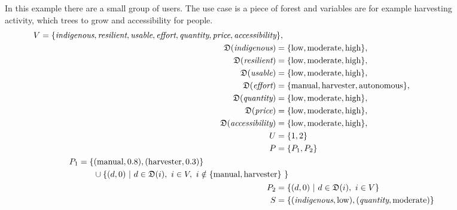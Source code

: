 \begin{figure}
    \begin{mdframed}[frametitle={Example for Forest Use Case}, linecolor=black, frametitlerulecolor=black, frametitlebackgroundcolor=gray!5]
        In this example there are a small group of users. The use case is a piece of forest and variables are for example harvesting activity, which trees to grow and accessibility for people.
        \begin{align}
            \begin{split}
                V = \{ & \textit{indigenous}, \textit{resilient}, \textit{usable}, \textit{effort}, \textit{quantity}, \textit{price}, \textit{accessibility} \},
            \end{split} \notag \\
            \mathfrak{D}(\textit{indigenous}) =  \{ & \text{low}, \text{moderate}, \text{high}\}, \notag \\
            \mathfrak{D}(\textit{resilient}) = \{ & \text{low}, \text{moderate}, \text{high}\}, \notag \\
            \mathfrak{D}(\textit{usable}) = \{ & \text{low}, \text{moderate}, \text{high}\}, \notag \\
            \mathfrak{D}(\textit{effort}) = \{ & \text{manual}, \text{harvester}, \text{autonomous}\}, \notag \\
            \mathfrak{D}(\textit{quantity}) = \{ & \text{low}, \text{moderate}, \text{high}\}, \notag \\
            \mathfrak{D}(\textit{price}) = \{ & \text{low}, \text{moderate}, \text{high}\}, \notag\\
            \mathfrak{D}(\textit{accessibility}) = \{ & \text{low}, \text{moderate}, \text{high}\},\notag \\
            U = \{ & 1,2\} \notag\\
            P = \{ & P_1, P_2\} \notag\\
            \begin{split}
                P_1 = \{ & (\text{manual}, 0.8), (\text{harvester}, 0.3) \} \\ 
                & \cup \{ (d,0)\ |\ d \in \mathfrak{D}(i),\ i \in V,\ i \notin \{ \text{manual}, \text{harvester}\} \ \} \ 
            \end{split} \notag \\
            P_2 = \{ & (d,0)\ |\ d \in \mathfrak{D}(i),\ i \in V \} \notag \\
            S  =  \{ & (\textit{indigenous}, \text{low}), (\textit{quantity}, \text{moderate}) \} \notag \\

\end{align}
\end{mdframed}
\end{figure}
